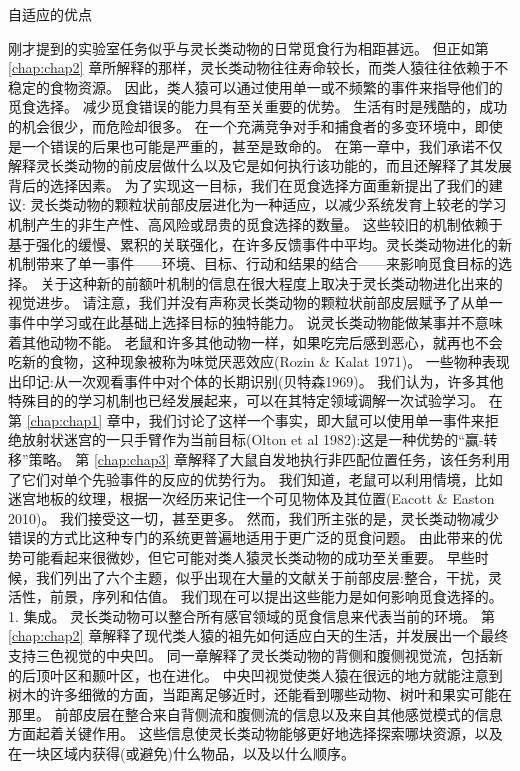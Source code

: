 自适应的优点

刚才提到的实验室任务似乎与灵长类动物的日常觅食行为相距甚远。
但正如第 \ref{chap:chap2} 章所解释的那样，灵长类动物往往寿命较长，而类人猿往往依赖于不稳定的食物资源。
因此，类人猿可以通过使用单一或不频繁的事件来指导他们的觅食选择。
减少觅食错误的能力具有至关重要的优势。
生活有时是残酷的，成功的机会很少，而危险却很多。
在一个充满竞争对手和捕食者的多变环境中，即使是一个错误的后果也可能是严重的，甚至是致命的。
在第一章中，我们承诺不仅解释灵长类动物的前皮层做什么以及它是如何执行该功能的，而且还解释了其发展背后的选择因素。
为了实现这一目标，我们在觅食选择方面重新提出了我们的建议:
灵长类动物的颗粒状前部皮层进化为一种适应，以减少系统发育上较老的学习机制产生的非生产性、高风险或昂贵的觅食选择的数量。
这些较旧的机制依赖于基于强化的缓慢、累积的关联强化，在许多反馈事件中平均。灵长类动物进化的新机制带来了单一事件——环境、目标、行动和结果的结合——来影响觅食目标的选择。
关于这种新的前额叶机制的信息在很大程度上取决于灵长类动物进化出来的视觉进步。
请注意，我们并没有声称灵长类动物的颗粒状前部皮层赋予了从单一事件中学习或在此基础上选择目标的独特能力。
说灵长类动物能做某事并不意味着其他动物不能。
老鼠和许多其他动物一样，如果吃完后感到恶心，就再也不会吃新的食物，这种现象被称为味觉厌恶效应(Rozin \& Kalat 1971)。
一些物种表现出印记:从一次观看事件中对个体的长期识别(贝特森1969)。
我们认为，许多其他特殊目的的学习机制也已经发展起来，可以在其特定领域调解一次试验学习。
在第 \ref{chap:chap1} 章中，我们讨论了这样一个事实，即大鼠可以使用单一事件来拒绝放射状迷宫的一只手臂作为当前目标(Olton et al 1982):这是一种优势的“赢-转移”策略。
第 \ref{chap:chap3} 章解释了大鼠自发地执行非匹配位置任务，该任务利用了它们对单个先验事件的反应的优势行为。
我们知道，老鼠可以利用情境，比如迷宫地板的纹理，根据一次经历来记住一个可见物体及其位置(Eacott \& Easton 2010)。
我们接受这一切，甚至更多。
然而，我们所主张的是，灵长类动物减少错误的方式比这种专门的系统更普遍地适用于更广泛的觅食问题。
由此带来的优势可能看起来很微妙，但它可能对类人猿灵长类动物的成功至关重要。
早些时候，我们列出了六个主题，似乎出现在大量的文献关于前部皮层:整合，干扰，灵活性，前景，序列和估值。
我们现在可以提出这些能力是如何影响觅食选择的。
1. 集成。
灵长类动物可以整合所有感官领域的觅食信息来代表当前的环境。
第 \ref{chap:chap2} 章解释了现代类人猿的祖先如何适应白天的生活，并发展出一个最终支持三色视觉的中央凹。
同一章解释了灵长类动物的背侧和腹侧视觉流，包括新的后顶叶区和颞叶区，也在进化。
中央凹视觉使类人猿在很远的地方就能注意到树木的许多细微的方面，当距离足够近时，还能看到哪些动物、树叶和果实可能在那里。
前部皮层在整合来自背侧流和腹侧流的信息以及来自其他感觉模式的信息方面起着关键作用。
这些信息使灵长类动物能够更好地选择探索哪块资源，以及在一块区域内获得(或避免)什么物品，以及以什么顺序。
